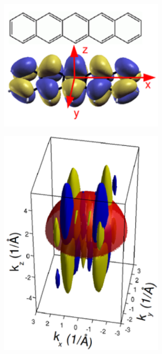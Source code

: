         \begin{figure}
            \centering
            \begin{subfigure}{0.3\textwidth}
                \centering
                \includegraphics[width=0.9\textwidth]{DFT1.PNG}
                \caption{}
                \label{fig:DFT1}
            \end{subfigure}
            \begin{subfigure}{0.3\textwidth}
                \centering
                \includegraphics[width=0.9\textwidth]{DFT2.PNG}

\end{subfigure}
\end{figure}
